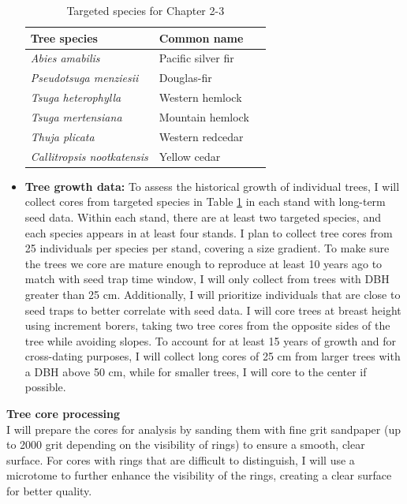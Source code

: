 \documentclass[11pt,letter]{article}
\begin{document}
\begin{itemize}
\begin{table}[H]
\centering
\small
\caption{Targeted species for Chapter 2-3}
\begin{tabular}{|p{5cm}|p{5cm}|p{5cm}|}
\hline
 \textbf{Tree species} & \textbf{Common name}\\ \hline 
\textit{Abies amabilis} & Pacific silver fir \\ \hline
\textit{Pseudotsuga menziesii} & Douglas-fir\\ \hline
\textit{Tsuga heterophylla} & Western hemlock\\ \hline
\textit{Tsuga mertensiana} & Mountain hemlock\\ \hline
\textit{Thuja plicata} & Western redcedar\\ \hline
\textit{Callitropsis nootkatensis} & Yellow cedar\\ \hline
\end{tabular}
\label{table:species}
\end{table}
	\item \textbf{Tree growth data:}  To assess the historical growth of individual trees, I will collect cores from targeted species in Table \ref{table:species} in each stand with long-term seed data. Within each stand, there are at least two targeted species, and each species appears in at least four stands. I plan to collect tree cores from 25 individuals per species per stand, covering a size gradient. To make sure the trees we core are mature enough to reproduce at least 10 years ago to match with seed trap time window, I will only collect from trees with DBH greater than 25 cm. Additionally, I will prioritize individuals that are close to seed traps to better correlate with seed data. I will core trees at breast height using increment borers, taking two tree cores from the opposite sides of the tree while avoiding slopes. To account for at least 15 years of growth and for cross-dating purposes, I will collect long cores of 25 cm from larger trees with a DBH above 50 cm, while for smaller trees, I will core to the center if possible.
	\end{itemize}
\textbf{Tree core processing}\\
I will prepare the cores for analysis by sanding them with fine grit sandpaper (up to 2000 grit depending on the visibility of rings) to ensure a smooth, clear surface. For cores with rings that are difficult to distinguish, I will use a microtome to further enhance the visibility of the rings, creating a clear surface for better quality.
\end{document}
